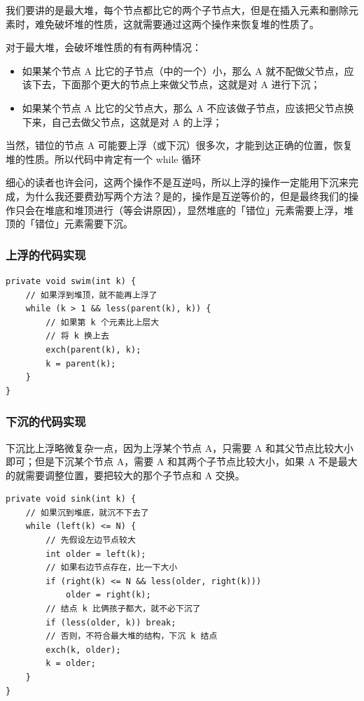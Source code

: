 \documentclass[12pt]{article}
\begin{document}
我们要讲的是最大堆，每个节点都比它的两个子节点大，但是在插入元素和删除元素时，难免破坏堆的性质，这就需要通过这两个操作来恢复堆的性质了。

对于最大堆，会破坏堆性质的有有两种情况：
\begin{itemize}
\setlength{\itemsep}{0pt}
\setlength{\parsep}{0pt}
\setlength{\parskip}{0pt}
    \item 如果某个节点 A 比它的子节点（中的一个）小，那么 A 就不配做父节点，应该下去，下面那个更大的节点上来做父节点，这就是对 A 进行下沉；
    \item 如果某个节点 A 比它的父节点大，那么 A 不应该做子节点，应该把父节点换下来，自己去做父节点，这就是对 A 的上浮；
\end{itemize}

当然，错位的节点 A 可能要上浮（或下沉）很多次，才能到达正确的位置，恢复堆的性质。所以代码中肯定有一个 while 循环

细心的读者也许会问，这两个操作不是互逆吗，所以上浮的操作一定能用下沉来完成，为什么我还要费劲写两个方法？是的，操作是互逆等价的，但是最终我们的操作只会在堆底和堆顶进行（等会讲原因），显然堆底的「错位」元素需要上浮，堆顶的「错位」元素需要下沉。

\subsubsection{上浮的代码实现}
\begin{lstlisting}
private void swim(int k) {
    // 如果浮到堆顶，就不能再上浮了
    while (k > 1 && less(parent(k), k)) {
        // 如果第 k 个元素比上层大
        // 将 k 换上去
        exch(parent(k), k);
        k = parent(k);
    }
}
\end{lstlisting}

\subsubsection{下沉的代码实现}
下沉比上浮略微复杂一点，因为上浮某个节点 A，只需要 A 和其父节点比较大小即可；但是下沉某个节点 A，需要 A 和其两个子节点比较大小，如果 A 不是最大的就需要调整位置，要把较大的那个子节点和 A 交换。
\begin{lstlisting}
private void sink(int k) {
    // 如果沉到堆底，就沉不下去了
    while (left(k) <= N) {
        // 先假设左边节点较大
        int older = left(k);
        // 如果右边节点存在，比一下大小
        if (right(k) <= N && less(older, right(k)))
            older = right(k);
        // 结点 k 比俩孩子都大，就不必下沉了
        if (less(older, k)) break;
        // 否则，不符合最大堆的结构，下沉 k 结点
        exch(k, older);
        k = older;
    }
}
\end{lstlisting}
\end{document}

